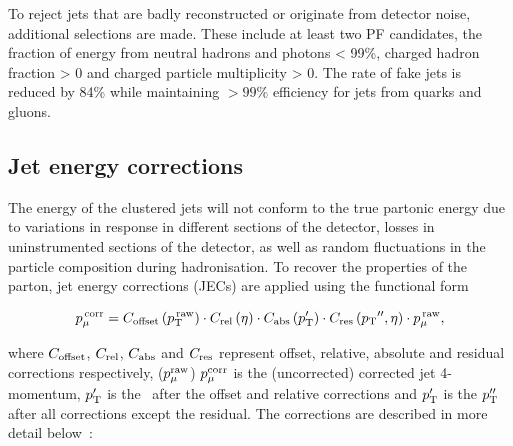 To reject jets that are badly reconstructed or originate from detector noise, additional selections are made. These include at least
two PF candidates, the fraction of energy from neutral hadrons and photons < 99\%,  charged hadron fraction > 0 and charged particle multiplicity > 0.
The rate of fake jets is reduced by 84\% while maintaining $> 99\%$ efficiency for jets from quarks and gluons.

\subsection{Jet energy corrections}
\label{sec:jec}
The energy of the clustered jets will not conform to the true partonic energy due to variations in response in different sections of the detector, losses in uninstrumented sections of the detector, as well as 
random fluctuations in the particle composition during hadronisation. To recover the properties of the parton, jet energy corrections 
(JECs) are applied using the functional form~\cite{jec}

\begin{equation}
\label{equ:jec}
  p_{\mu}^{\,\rm{corr}}=C_{\rm{offset}}\left(p_{\text{T}}^{\,\rm{raw}}\right)\cdot
  C_{\rm{rel}}\left(\eta\right)\cdot C_{\rm{abs}}\left(p_{\rm{T}}'\right)\cdot
  C_{\rm{res}}\left({p_{\text T}}'',\eta\right)\cdot p_{\mu}^{\,\rm{raw}},
\end{equation}

\noindent where $C_{\rm{offset}}$, $C_{\rm{rel}}$, $C_{\rm{abs}}$ and $C_{\rm{res}}$ represent offset,
relative, absolute and residual corrections respectively, 
 ($p_{\mu}^{\rm{raw}}$) $p_{\mu}^{\rm{corr}}$ is the (uncorrected) corrected jet 4-momentum, $p'_{\rm{T}}$ is the \pt~after the 
 offset and relative corrections and  $p'_{\rm{T}}$ is the $p''_{\rm{T}}$ after
all corrections except the residual. The corrections are described in more detail below~\cite{jec2}:

